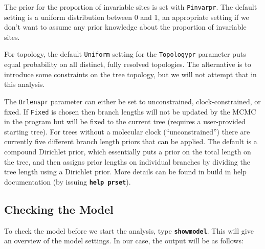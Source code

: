 \documentclass[12pt]{book}
\newcommand{\ttt}[1]{\texttt{#1}}
\newcommand{\tb}[1]{\ttt{\textbf{#1}}}
\begin{document}
The prior for the proportion of invariable sites is set with \texttt{Pinvarpr}. The default setting
is a uniform distribution between 0 and 1, an appropriate setting if we don't want to assume any
prior knowledge about the proportion of invariable sites.

For topology, the default \texttt{Uniform} setting for the \texttt{Topologypr} parameter puts equal
probability on all distinct, fully resolved topologies. The alternative is to introduce some
constraints on the tree topology, but we will not attempt that in this analysis.

The \texttt{Brlenspr} parameter can either be set to unconstrained, clock-constrained, or fixed. If
\texttt{Fixed} is chosen then branch lengths will not be updated by the MCMC in the program but
will be fixed to the current tree (requires a user-provided starting tree).
For trees without a molecular clock (``unconstrained'') there are currently five different branch
length priors that can be applied. The default is a compound Dirichlet prior, which essentially
puts a prior on the total length on the tree, and then assigns prior lengths on individual branches
by dividing the tree length using a Dirichlet prior.
More details can be found in build in help documentation (by issuing \tb{help prset}).

\subsection{Checking the Model}

To check the model before we start the analysis, type \tb{showmodel}. This will give an
overview of the model settings. In our case, the output will be as follows:
\end{document}
